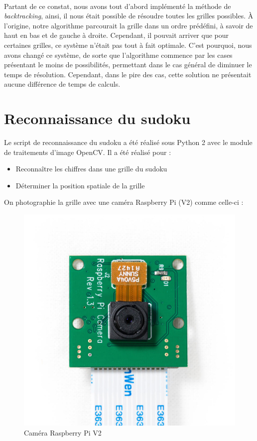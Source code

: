 \documentclass[12pt,a4paper]{report}
\begin{document}
\paragraph{} Partant de ce constat, nous avons tout d'abord implémenté la méthode de \emph{backtracking}, ainsi, il nous était possible de résoudre toutes les grilles possibles. \`{A} l'origine, notre algorithme parcourait la grille dans un ordre prédéfini, à savoir de haut en bas et de gauche à droite. Cependant, il pouvait arriver que pour certaines grilles, ce système n'était pas tout à fait optimale. C'est pourquoi, nous avons changé ce système, de sorte que l'algorithme commence par les cases présentant le moins de possibilités, permettant dans le cas général de diminuer le temps de résolution. Cependant, dans le pire des cas, cette solution ne présentait aucune différence de temps de calculs.
	
\section{Reconnaissance du sudoku}
	Le script de reconnaissance du sudoku a été réalisé sous Python 2 avec le module de traitements d'image OpenCV. Il a été réalisé pour :
	\begin{itemize}[label=--]
	\item Reconnaître les chiffres dans une grille du sudoku
	\item Déterminer la position spatiale de la grille
	\end{itemize}
	\newpage
	On photographie la grille avec une caméra Raspberry Pi (V2) comme celle-ci :
	\begin{figure}[!h]
 \center
 \includegraphics[scale=0.2]{../pictures/camera.jpg}
 \caption{Caméra Raspberry Pi V2}
\end{figure}
\end{document}
